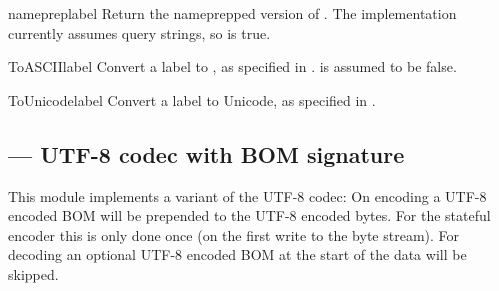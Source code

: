 \begin{funcdesc}{nameprep}{label}
Return the nameprepped version of . The implementation
currently assumes query strings, so  is
true.
\end{funcdesc}

\begin{funcdesc}{ToASCII}{label}
Convert a label to \ASCII, as specified in .
 is assumed to be false.
\end{funcdesc}

\begin{funcdesc}{ToUnicode}{label}
Convert a label to Unicode, as specified in .
\end{funcdesc}

 \subsection{ ---
             UTF-8 codec with BOM signature}


This module implements a variant of the UTF-8 codec: On encoding a
UTF-8 encoded BOM will be prepended to the UTF-8 encoded bytes. For
the stateful encoder this is only done once (on the first write to the
byte stream).  For decoding an optional UTF-8 encoded BOM at the start
of the data will be skipped.
